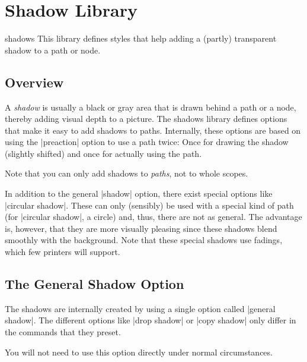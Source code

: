 %
%
%

\section{Shadow Library}
\label{section-libs-shadows}

\begin{pgflibrary}{shadows}
  This library defines styles that help adding a (partly) transparent
  shadow to a path or node.
\end{pgflibrary}


\subsection{Overview}

A \emph{shadow} is usually a black or gray area that is drawn behind a
path or a node, thereby adding visual depth to a picture. The shadows
library defines options that make it easy to add shadows to
paths. Internally, these options are based on using the |preaction|
option to use a path twice: Once for drawing the shadow (slightly
shifted) and once for actually using the path.

Note that you can only add shadows to \emph{paths}, not to whole
scopes.

In addition to the general |shadow| option, there exist special
options like |circular shadow|. These can only (sensibly) be used with
a special kind of path (for |circular shadow|, a circle) and, thus,
there are not as general. The advantage is, however, that they are
more visually pleasing since these shadows blend smoothly with the
background. Note that these special shadows use fadings, which few
printers will support.


\subsection{The General Shadow Option}

The shadows are internally created by using a single option called
|general shadow|. The different options like |drop shadow| or
|copy shadow| only differ in the commands that they preset.

You will not need to use this option directly under normal
circumstances.


